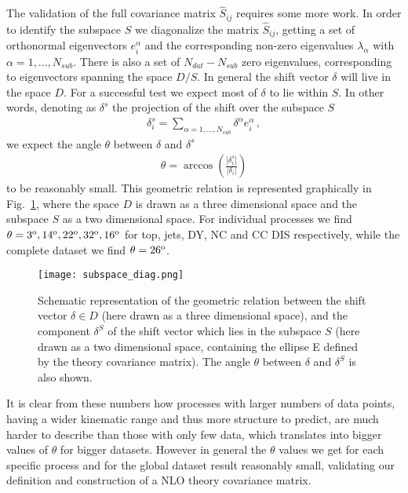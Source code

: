     The validation of the full covariance matrix $\hat{S}_{ij}$ requires some more work.
    In order to identify the subspace $S$ we diagonalize the matrix $\hat{S}_{ij}$, getting a set
    of orthonormal eigenvectors $e_i^{\alpha}$ and the corresponding non-zero eigenvalues 
    $\lambda_{\alpha}$ with $\alpha = 1, ..., N_{sub}$.
    There is also a set of $N_{dat}-N_{sub}$ zero eigenvalues, corresponding to eigenvectors spanning
    the space $D/S$.
    In general the shift vector $\delta$ will live in the space $D$. 
    For a successful test we expect most of $\delta$ to lie within $S$.
    In other words, denoting as $\delta^s$ the projection of the shift over the subspace $S$
    \begin{align}
        \delta_i^s = \sum_{\alpha=1,...,N_{sub}} \delta^{\alpha}e^{\alpha}_i\,,
    \end{align} 
    we expect the angle $\theta$ between $\delta$ and $\delta^s$
    \begin{align}
        \theta = \arccos\left(\frac{|\delta_i^s|}{|\delta_i|}\right)
    \end{align}
    to be reasonably small. This geometric relation is represented graphically in Fig.~\ref{fig:subspace_diagram},
    where the space $D$ is drawn as a three dimensional space and the subspace $S$ as a two dimensional space.
    For individual processes we find $\theta = 3^{\rm o}, 14^{\rm o}, 22^{\rm o}, 32^{\rm o}, 16^{\rm o}$ for top, jets, DY, NC and CC DIS respectively, 
    while the complete dataset we find $\theta = 26^{\rm o}$.
    \begin{figure}[t]
        \begin{center}
          \texttt{[image: subspace\_diag.png]}
          \caption{\small Schematic representation of the geometric relation
            between the shift vector $\delta\in D$ (here drawn as a three dimensional space), and
            the component $\delta^S$ of the shift vector which lies in the 
      subspace $S$ (here drawn as a two dimensional space, containing the ellipse E defined by the theory covariance matrix). 
      The angle $\theta$ between $\delta$ and $\delta^S$ is also shown.
          \label{fig:subspace_diagram} }
        \end{center}
      \end{figure}
    It is clear from these numbers how processes with larger numbers of data points, having 
    a wider kinematic range and thus more structure to predict, are much harder to describe than those 
    with only few data, which translates into bigger values of $\theta$ for bigger datasets. However in general the
    $\theta$ values we get for each specific process and for the global dataset result reasonably small, validating our definition
    and construction of a NLO theory covariance matrix.


